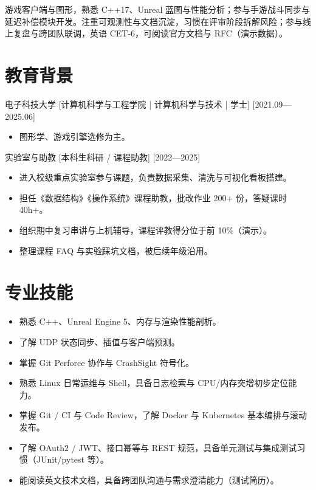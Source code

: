 \documentclass{resume-photo}
\begin{document}

\ResumeTitle

\noindent 游戏客户端与图形，熟悉 C++17、Unreal 蓝图与性能分析；参与手游战斗同步与延迟补偿模块开发。注重可观测性与文档沉淀，习惯在评审阶段拆解风险；参与线上复盘与跨团队联调，英语 CET-6，可阅读官方文档与 RFC（演示数据）。

\section{教育背景}
\ResumeItem
{电子科技大学}
[\textnormal{计算机科学与工程学院 | 计算机科学与技术 | 学士}]
[2021.09—2025.06]

\begin{itemize}
  \item 图形学、游戏引擎选修为主。
\end{itemize}


\ResumeItem
{实验室与助教}
[\textnormal{本科生科研 / 课程助教}]
[2022—2025]

\begin{itemize}
  \item 进入校级重点实验室参与课题，负责数据采集、清洗与可视化看板搭建。
  \item 担任《数据结构》《操作系统》课程助教，批改作业 200+ 份，答疑课时 40h+。
  \item 组织期中复习串讲与上机辅导，课程评教得分位于前 10\%（演示）。
  \item 整理课程 FAQ 与实验踩坑文档，被后续年级沿用。
\end{itemize}



\section{专业技能}
\begin{itemize}
  \item 熟悉 C++、Unreal Engine 5、内存与渲染性能剖析。
  \item 了解 UDP 状态同步、插值与客户端预测。
  \item 掌握 Git Perforce 协作与 CrashSight 符号化。
  \item 熟悉 Linux 日常运维与 Shell，具备日志检索与 CPU/内存突增初步定位能力。
  \item 掌握 Git / CI 与 Code Review，了解 Docker 与 Kubernetes 基本编排与滚动发布。
  \item 了解 OAuth2 / JWT、接口幂等与 REST 规范，具备单元测试与集成测试习惯（JUnit/pytest 等）。
  \item 能阅读英文技术文档，具备跨团队沟通与需求澄清能力（测试简历）。
\end{itemize}
\end{document}

